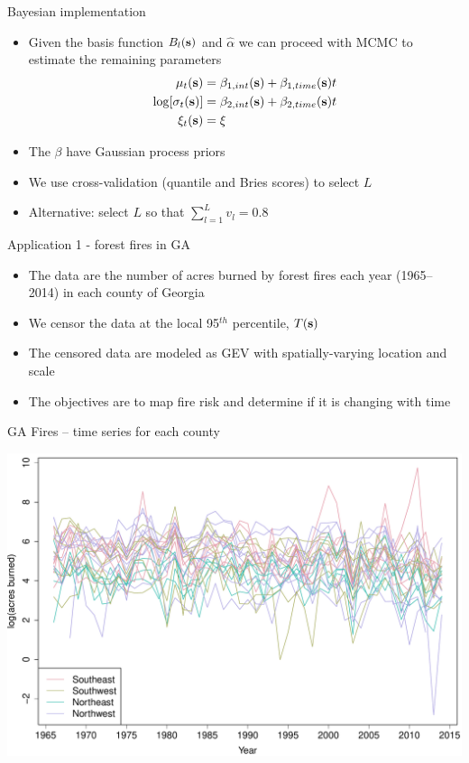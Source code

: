 \documentclass{beamer}
\begin{document}
\begin{frame}{Bayesian implementation}
	\begin{itemize}\setlength{\itemsep}{1em}
		\item Given the basis function $B_l(\mathbf{s})$ and $\hat{\alpha}$ we can proceed with MCMC to estimate the remaining parameters
		\begin{align*}
		  \mu_t(\mathbf{s}) &= \beta_{1,int}(\mathbf{s}) + \beta_{1,time}(\mathbf{s})t\\
		  \log[\sigma_t(\mathbf{s})] &= \beta_{2,int}(\mathbf{s}) + \beta_{2,time}(\mathbf{s})t\\
		  \xi_t(\mathbf{s}) &= \xi
		\end{align*}
		\item The $\beta$ have Gaussian process priors
		\item We use cross-validation (quantile and Bries scores) to select $L$
		\item Alternative: select $L$ so that $\sum_{l=1}^Lv_l = 0.8$
	\end{itemize}
\end{frame}


\begin{frame}{Application 1 - forest fires in GA}
	\begin{itemize}\setlength{\itemsep}{1em}
		\item The data are the number of acres burned by forest fires each year (1965--2014) in each county of Georgia
		\item We censor the data at the local 95$^{th}$ percentile, $T(\mathbf{s})$
		\item The censored data are modeled as GEV with spatially-varying location and scale
		\item The objectives are to map fire risk and determine if it is changing with time
	\end{itemize}
\end{frame}


\begin{frame}{GA Fires -- time series for each county }
	\begin{center}
		\includegraphics[width=1.0\textwidth]{fire-spag-rand-25}
	\end{center}
\end{frame}
\end{document}
